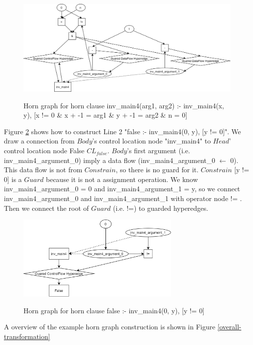 \documentclass{article}
\begin{document}
\begin{figure}[h]
\centering
  \includegraphics[width=14cm]{graph/horn-grapn-line-1}\\
  \caption{Horn graph for horn clause inv\_main4(arg1, arg2) :- inv\_main4(x, y), [x != 0 \& x + -1 = arg1 \& y + -1 = arg2 \& n = 0]}\label{horn-grapn-line-1}
\end{figure}

Figure \ref{horn-grapn-line-2} shows how to construct Line 2 "false :- inv\_main4(0, y), [y != 0]". We draw a connection from $Body$'s control location node "inv\_main4" to $Head$' control location node False $CL_{false}$. $Body$'s first argument (i.e. inv\_main4\_argument\_0) imply a data flow (inv\_main4\_argument\_0 $\leftarrow$ 0). This data flow is not from $Constrain$, so there is no guard for it. $Constrain$ [y != 0] is a $Guard$ because it is not a assignment operation. We know inv\_main4\_argument\_0 = 0 and inv\_main4\_argument\_1 = y, so we connect inv\_main4\_argument\_0 and inv\_main4\_argument\_1 with operator node != . Then we connect the root of $Guard$ (i.e. !=) to guarded hyperedges.

\begin{figure}[h]
\centering
  \includegraphics[width=8cm]{graph/horn-grapn-line-2}\\
  \caption{Horn graph for horn clause false :- inv\_main4(0, y), [y != 0]}\label{horn-grapn-line-2}
\end{figure}


A overview of the example horn graph construction is shown in Figure \ref{overall-transformation}
\end{document}
